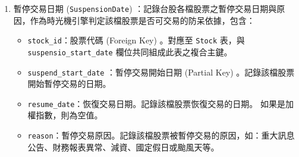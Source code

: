 \documentclass[UTF8, a4paper, 12pt, fontset=none]{ctexart}
\begin{document}
\begin{enumerate}
\begin{itemize}
            \item \texttt{volume}：當日成交量 (張數) 。作為市場流動性之真實指標，未來可供系統實作「玩家單筆委託量不得超過當日市場總量之一定比例」的進階防呆機制。
            \item \texttt{ref\_price}：當日開盤參考價。通常為前一交易日之收盤價；若遇除權息或面額變更等重大事件，此價格將直接反映扣除股息或分割後之基準價，供前端正確繪製 K 線跳空缺口。
            \item \texttt{limit\_up} / \texttt{limit\_down}：當日漲停價與當日跌停價。
            \item \texttt{is\_attention} / \texttt{is\_disposition} / \texttt{is\_full\_delivery}：交易異常個股 (注意股、處置股、全額交割股) 。採用布林值 (Boolean) 記錄。
        \end{itemize}
        \item 暫停交易日期 (\texttt{SuspensionDate}) ：記錄台股各檔股票之暫停交易日期與原因，作為時光機引擎判定該檔股票是否可交易的防呆依據，包含：
        \begin{itemize}
            \item \texttt{stock\_id}：股票代碼 (Foreign Key) 。對應至 \texttt{Stock} 表，與\\ \texttt{suspensio\_start\_date} 欄位共同組成此表之複合主鍵。
            \item \texttt{suspend\_start\_date} ：暫停交易開始日期 (Partial Key) 。記錄該檔股票開始暫停交易的日期。
            \item \texttt{resume\_date}：恢復交易日期。記錄該檔股票恢復交易的日期。 如果是加權指數，則為空值。
            \item \texttt{reason}：暫停交易原因。記錄該檔股票被暫停交易的原因，如：重大訊息公告、財務報表異常、減資、國定假日或颱風天等。
        \end{itemize}
    \end{enumerate}
\end{document}

